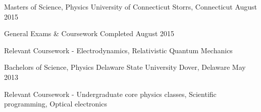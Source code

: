 

\begin{cventries}
 

\cventry
{Masters of Science, Physics}
{University of Connecticut}
{Storrs, Connecticut}
{August 2015}
{
\begin{cvitems}
\item General Exams \& Coursework Completed August 2015
\item Relevant Coursework - Electrodynamics, Relativistic Quantum Mechanics
\end{cvitems}
}

\cventry
    {Bachelors of Science, Physics} %
    {Delaware State University} %
    {Dover, Delaware} %
    {May 2013} %
    {
        \begin{cvitems}
            \item Relevant Coursework - Undergraduate core physics classes, Scientific programming, Optical electronics
        \end{cvitems}
    }
\end{cventries}

